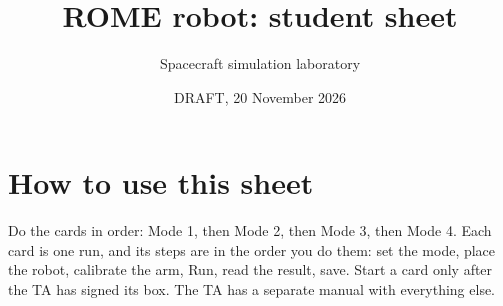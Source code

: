 \documentclass[10pt]{article}
\title{\vspace{-1.2cm}ROME robot: student sheet}
\author{Spacecraft simulation laboratory}
\date{DRAFT, 20 November 2026}
\newcommand{\todo}[1]{\textcolor{red}{\textbf{[#1]}}}
\newcommand{\cmd}[1]{\texttt{\romecode{#1}}}
\newcommand{\out}[1]{\texttt{\romecode{#1}}}
\newif\ifshowsrc
\newcommand{\src}[1]{\ifshowsrc{\scriptsize\,[\texttt{\romecode{#1}}]}\else\unskip\fi}
\begin{document}
\frenchspacing
\maketitle
\vspace{-0.6cm}

\newcommand{\verdictstep}[1]{\item \textbf{Read the result.} Within about \SI{10}{\second} of the stop MATLAB prints a
  line that begins \out{RUN VERDICT mode #1:} \src{rome_run_end.m:14; run_verdict_core.m:161} On \out{FAIL} or
  \out{INCOMPLETE}: start nothing else, show the line to the TA, and go on only when the TA says so. No such line within
  about \SI{10}{\second}: call the TA.}
\newcommand{\calibbody}{The arm moves now, on every card: each joint drives into its limit switch. Clear zone around the
  arm empty; your partner's hand on the power cut-off; only the power cut stops a calibration. Type
  \cmd{calibrateROMEArm;} and wait; it can take up to three minutes \src{calibrateROMEArm.m:42; calibrateROMEArm.m:11; calibrateROMEArm.m:133}.
  \textbf{Success:} near the end MATLAB prints \out{Park record written (entry <n>)} \src{calibrateROMEArm.m:216}. If it
  prints \out{NO park record written} \src{calibrateROMEArm.m:218} or \out{DO NOT run a robot mode}
  \src{calibrateROMEArm.m:192}, or the arm does not look like the text under \out{Expected posture}
  \src{calibrateROMEArm.m:189-190}, stop and call the TA. Never move a joint yourself (\cmd{jog_joint}, \cmd{jogROMEArm}):
  that is a TA action \src{calibrateROMEArm.m:193}.}
\newcommand{\placebody}[1]{\textbf{Place the robot with its power off.} Your partner turns the robot's power off with
  the switch the TA showed you; the motors then have no power. Push it by hand #1 Then your partner turns the power on.
  Before you calibrate, check that the lab PC is still on the robot's Wi-Fi (the TA shows you where) \src{docs/lab/PART_F_BENCH_CHECKLIST.md:66}.
  \todo{NOT VERIFIED: whether the power switch also turns off the robot's Wi-Fi, Part F item 25c}}

\section*{How to use this sheet}
Do the cards in order: Mode 1, then Mode 2, then Mode 3, then Mode 4. Each card is one run, and its steps are in the
order you do them: set the mode, place the robot, calibrate the arm, Run, read the result, save. Start a card only
after the TA has signed its box. The TA has a separate manual with everything else.
\end{document}
